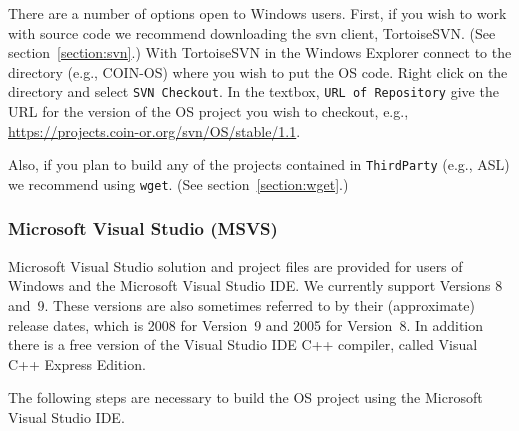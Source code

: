 \documentclass[11pt]{article}
\renewcommand{\_}{{\char"5F}}
\renewcommand{\{}{{\char"7B}}
\renewcommand{\}}{{\char"7D}}
\renewcommand{\^}{{\char"0D}}
\renewcommand{\'}{{\char"0D}}
\begin{document}
There are a number of options open to Windows users.   First, if you wish to work with source code we recommend downloading  the svn client,  
TortoiseSVN.  (See section~\ref{section:svn}.)  With TortoiseSVN in the Windows Explorer connect to the directory (e.g., COIN-OS) 
where you wish to put the OS code. Right click on the directory and select {\tt SVN Checkout}.   In the textbox, {\tt URL of Repository} 
give the URL for the version of the OS project you wish to checkout, e.g., \url{https://projects.coin-or.org/svn/OS/stable/1.1}.

Also, if you plan to build any of the projects contained in {\tt ThirdParty} 
(e.g., ASL) we recommend using {\tt wget}. (See section~\ref{section:wget}.)
%



\subsubsection{Microsoft Visual Studio (MSVS)} \label{section:msvs}


Microsoft Visual Studio solution and project files are provided for users of Windows and the Microsoft Visual Studio IDE.   
We currently support Versions 8 and~9. These versions are also sometimes referred to by their 
(approximate) release dates, which is 2008 for Version~9 and 2005 for Version~8.   In addition there is 
a free version of the Visual Studio IDE C++ compiler,  called Visual C++ Express Edition.    

The following steps are necessary to build the OS project using the  Microsoft Visual Studio IDE.
\end{document}
